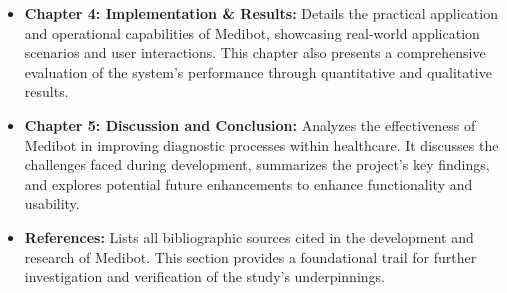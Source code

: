 \begin{itemize}
    \item \textbf{Chapter 4: Implementation \& Results:} Details the practical application and operational capabilities of Medibot, showcasing real-world application scenarios and user interactions. This chapter also presents a comprehensive evaluation of the system's performance through quantitative and qualitative results.
    
    \item \textbf{Chapter 5: Discussion and Conclusion:} Analyzes the effectiveness of Medibot in improving diagnostic processes within healthcare. It discusses the challenges faced during development, summarizes the project's key findings, and explores potential future enhancements to enhance functionality and usability.
    
    \item \textbf{References:} Lists all bibliographic sources cited in the development and research of Medibot. This section provides a foundational trail for further investigation and verification of the study's underpinnings.
\end{itemize}